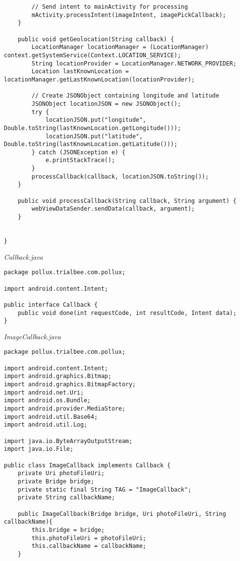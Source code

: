 \begin{appendices}
\begin{lstlisting}
        // Send intent to mainActivity for processing
        mActivity.processIntent(imageIntent, imagePickCallback);
    }

    public void getGeolocation(String callback) {
        LocationManager locationManager = (LocationManager) context.getSystemService(Context.LOCATION_SERVICE);
        String locationProvider = LocationManager.NETWORK_PROVIDER;
        Location lastKnownLocation = locationManager.getLastKnownLocation(locationProvider);

        // Create JSONObject containing longitude and latitude
        JSONObject locationJSON = new JSONObject();
        try {
            locationJSON.put("longitude", Double.toString(lastKnownLocation.getLongitude()));
            locationJSON.put("latitude", Double.toString(lastKnownLocation.getLatitude()));
        } catch (JSONException e) {
            e.printStackTrace();
        }
        processCallback(callback, locationJSON.toString());
    }

    public void processCallback(String callback, String argument) {
        webViewDataSender.sendData(callback, argument);
    }


}
\end{lstlisting}
\emph{Callback.java}
\begin{lstlisting}
package pollux.trialbee.com.pollux;

import android.content.Intent;

public interface Callback {
    public void done(int requestCode, int resultCode, Intent data);
}
\end{lstlisting}

\emph{ImageCallback.java}
\begin{lstlisting}
package pollux.trialbee.com.pollux;

import android.content.Intent;
import android.graphics.Bitmap;
import android.graphics.BitmapFactory;
import android.net.Uri;
import android.os.Bundle;
import android.provider.MediaStore;
import android.util.Base64;
import android.util.Log;

import java.io.ByteArrayOutputStream;
import java.io.File;

public class ImageCallback implements Callback {
    private Uri photoFileUri;
    private Bridge bridge;
    private static final String TAG = "ImageCallback";
    private String callbackName;

    public ImageCallback(Bridge bridge, Uri photoFileUri, String callbackName){
        this.bridge = bridge;
        this.photoFileUri = photoFileUri;
        this.callbackName = callbackName;
    }


\end{lstlisting}
\end{appendices}
